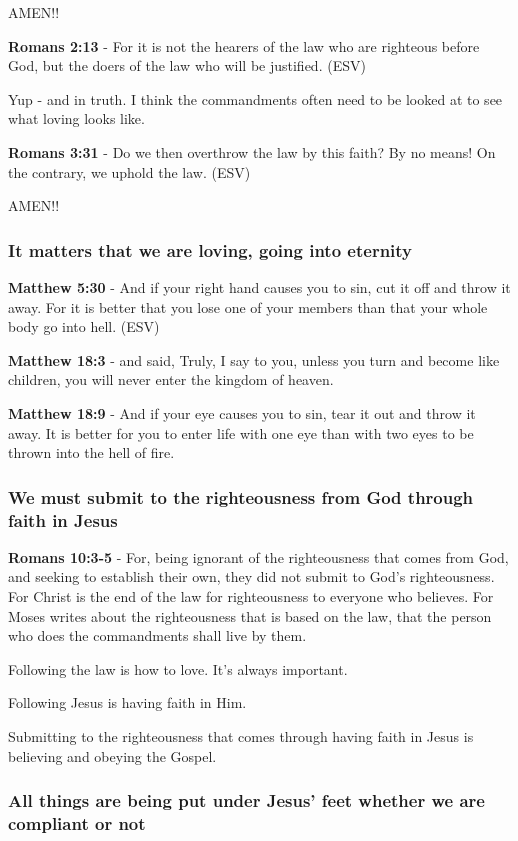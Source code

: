 \documentclass[11pt]{article}
\begin{document}
AMEN!!

\textbf{Romans 2:13} - For it is not the hearers of the law who are righteous before God, but the doers of the law who will be justified. (ESV)

Yup - and in truth. I think the commandments often need to be looked at to see what loving looks like.

\textbf{Romans 3:31} - Do we then overthrow the law by this faith? By no means! On the contrary, we uphold the law. (ESV)

AMEN!!

\subsubsection{It matters that we are loving, going into eternity}
\label{sec:orged0def9}
\textbf{Matthew 5:30} - And if your right hand causes you to sin, cut it off and throw it away. For it is better that you lose one of your members than that your whole body go into hell. (ESV)

\textbf{Matthew 18:3} - and said, Truly, I say to you, unless you turn and become like children, you will never enter the kingdom of heaven.

\textbf{Matthew 18:9} - And if your eye causes you to sin, tear it out and throw it away. It is better for you to enter life with one eye than with two eyes to be thrown into the hell of fire.

\subsubsection{We must submit to the righteousness from God through faith in Jesus}
\label{sec:org6a3f4a7}
\textbf{Romans 10:3-5} - For, being ignorant of the righteousness that comes from God, and seeking to establish their own, they did not submit to God's righteousness. For Christ is the end of the law for righteousness to everyone who believes. For Moses writes about the righteousness that is based on the law, that the person who does the commandments shall live by them.

Following the law is how to love. It's always important.

Following Jesus is having faith in Him.

Submitting to the righteousness that comes through having faith in Jesus is believing and obeying the Gospel.

\subsubsection{All things are being put under Jesus' feet whether we are compliant or not}
\label{sec:org3c839a0}
\end{document}
